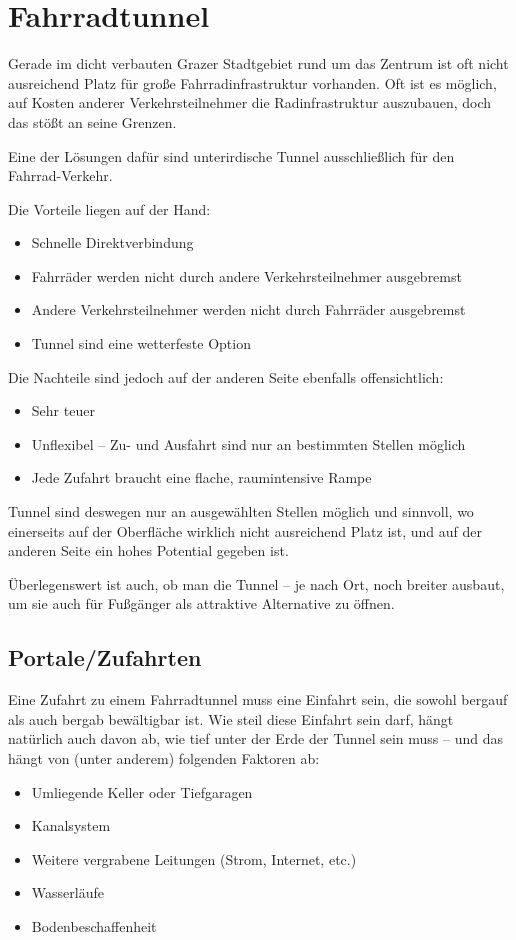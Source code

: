 \chapter{Fahrradtunnel}
Gerade im dicht verbauten Grazer Stadtgebiet rund um das Zentrum ist oft nicht ausreichend Platz für große Fahrradinfrastruktur vorhanden. Oft ist es möglich, auf Kosten anderer Verkehrsteilnehmer die Radinfrastruktur auszubauen, doch das stößt an seine Grenzen.

Eine der Lösungen dafür sind unterirdische Tunnel ausschließlich für den Fahrrad-Verkehr.

Die Vorteile liegen auf der Hand:
\begin{itemize}
    \item Schnelle Direktverbindung
    \item Fahrräder werden nicht durch andere Verkehrsteilnehmer ausgebremst
    \item Andere Verkehrsteilnehmer werden nicht durch Fahrräder ausgebremst
    \item Tunnel sind eine wetterfeste Option
\end{itemize}

Die Nachteile sind jedoch auf der anderen Seite ebenfalls offensichtlich:
\begin{itemize}
    \item Sehr teuer
    \item Unflexibel -- Zu- und Ausfahrt sind nur an bestimmten Stellen möglich
    \item Jede Zufahrt braucht eine flache, raumintensive Rampe
\end{itemize}

Tunnel sind deswegen nur an ausgewählten Stellen möglich und sinnvoll, wo einerseits auf der Oberfläche wirklich nicht ausreichend Platz ist, und auf der anderen Seite ein hohes Potential gegeben ist.

Überlegenswert ist auch, ob man die Tunnel -- je nach Ort, noch breiter ausbaut, um sie auch für Fußgänger als attraktive Alternative zu öffnen.

\section{Portale/Zufahrten}
Eine Zufahrt zu einem Fahrradtunnel muss eine Einfahrt sein, die sowohl bergauf als auch bergab bewältigbar ist. Wie steil diese Einfahrt sein darf, hängt natürlich auch davon ab, wie tief unter der Erde der Tunnel sein muss -- und das hängt von (unter anderem) folgenden Faktoren ab:
\begin{itemize}
    \item Umliegende Keller oder Tiefgaragen
    \item Kanalsystem
    \item Weitere vergrabene Leitungen (Strom, Internet, etc.)
    \item Wasserläufe
    \item Bodenbeschaffenheit
\end{itemize}

